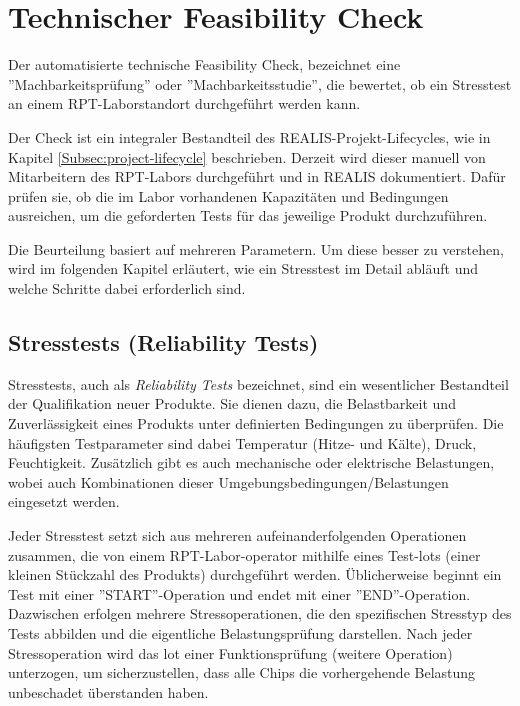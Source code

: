 \section{Technischer Feasibility Check}
Der automatisierte technische Feasibility Check, bezeichnet eine ''Machbarkeitsprüfung'' oder ''Machbarkeitsstudie'', die bewertet, ob ein Stresstest an einem \gls{RPT}-Laborstandort durchgeführt werden kann.

Der Check ist ein integraler Bestandteil des \gls{REALIS}-Projekt-Lifecycles, wie in Kapitel \ref{Subsec:project-lifecycle} beschrieben. Derzeit wird dieser manuell von Mitarbeitern des \gls{RPT}-Labors durchgeführt und in \gls{REALIS} dokumentiert. Dafür prüfen sie, ob die im Labor vorhandenen Kapazitäten und Bedingungen ausreichen, um die geforderten Tests für das jeweilige Produkt durchzuführen.

Die Beurteilung basiert auf mehreren Parametern. Um diese besser zu verstehen, wird im folgenden Kapitel erläutert, wie ein Stresstest im Detail abläuft und welche Schritte dabei erforderlich sind.


\subsection{Stresstests (Reliability Tests)}

Stresstests, auch als \textit{Reliability Tests} bezeichnet, sind ein wesentlicher Bestandteil der Qualifikation neuer Produkte. Sie dienen dazu, die Belastbarkeit und Zuverlässigkeit eines Produkts unter definierten Bedingungen zu überprüfen. Die häufigsten Testparameter sind dabei Temperatur (Hitze- und Kälte), Druck, Feuchtigkeit. Zusätzlich gibt es auch mechanische oder elektrische Belastungen, wobei auch Kombinationen dieser Umgebungsbedingungen/Belastungen eingesetzt werden.

Jeder Stresstest setzt sich aus mehreren aufeinanderfolgenden Operationen zusammen, die von einem \gls{RPT}-Labor-\gls{operator} mithilfe eines Test-\glspl{lot} (einer kleinen Stückzahl des Produkts) durchgeführt werden. Üblicherweise beginnt ein Test mit einer ''START''-Operation und endet mit einer ''END''-Operation. Dazwischen erfolgen mehrere Stressoperationen, die den spezifischen Stresstyp des Tests abbilden und die eigentliche Belastungsprüfung darstellen. Nach jeder Stressoperation wird das \gls{lot} einer Funktionsprüfung (weitere Operation) unterzogen, um sicherzustellen, dass alle Chips die vorhergehende Belastung unbeschadet überstanden haben.

